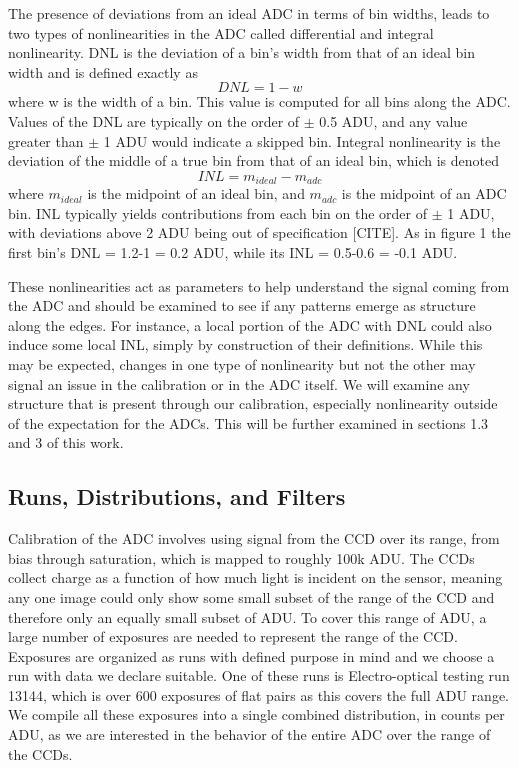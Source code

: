 \documentclass[11pt, letterpaper]{article}
\begin{document}
The presence of deviations from an ideal ADC in terms of bin widths, leads to two types of nonlinearities in the ADC called differential and integral nonlinearity. 
DNL is the deviation of a bin's width from that of an ideal bin width and is defined exactly as
\begin{equation}\label{}
DNL =1- w  
\end{equation}
where w is the width of a bin. 
This value is computed for all bins along the ADC. 
Values of the DNL are typically on the order of $\pm$ 0.5 ADU, and any value greater than $\pm$ 1 ADU would indicate a skipped bin. 
Integral nonlinearity is the deviation of the middle of a true bin from that of an ideal bin, which is denoted 
\begin{equation}\label{}
INL = m_{ideal} - m_{adc} 
\end{equation}
where $m_{ideal}$ is the midpoint of an ideal bin, and $m_{adc}$ is the midpoint of an ADC bin. 
INL typically yields contributions from each bin on the order of $\pm$ 1 ADU, with deviations above 2 ADU being out of specification [CITE]. 
As in figure 1 the first bin's DNL = 1.2-1 = 0.2 ADU, while its INL = 0.5-0.6 = -0.1 ADU. 
\indent


These nonlinearities act as parameters to help understand the signal coming from the ADC and should be examined to see if any patterns emerge as structure along the edges. 
For instance, a local portion of the ADC with DNL could also induce some local INL, simply by construction of their definitions.
While this may be expected, changes in one type of nonlinearity but not the other may signal an issue in the calibration or in the ADC itself.
We will examine any structure that is present through our calibration, especially nonlinearity outside of the expectation for the ADCs. 
This will be further examined in sections 1.3 and 3 of this work.


\subsection{Runs, Distributions, and Filters}
\indent

Calibration of the ADC involves using signal from the CCD over its range, from bias through saturation, which is mapped to roughly 100k ADU. 
The CCDs collect charge as a function of how much light is incident on the sensor, meaning any one image could only show some small subset of the range of the CCD and therefore only an equally small subset of ADU.
To cover this range of ADU, a large number of exposures are needed to represent the range of the CCD. 
Exposures are organized as runs with defined purpose in mind and we choose a run with data we declare suitable. 
One of these runs is Electro-optical testing run 13144, which is over 600 exposures of flat pairs as this covers the full ADU range. 
We compile all these exposures into a single combined distribution, in counts per ADU, as we are interested in the behavior of the entire ADC over the range of the CCDs. 
\end{document}
